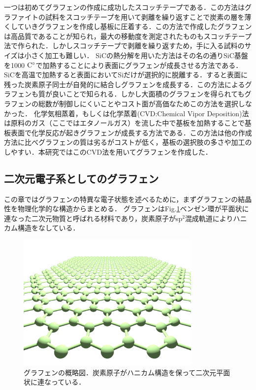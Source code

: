 一つは初めてグラフェンの作成に成功したスコッチテープである．この方法はグラファイトの試料をスコッチテープを用いて剥離を繰り返すことで炭素の層を薄くしていきグラフェンを作成し基板に圧着する．この方法で作成したグラフェンは高品質であることが知られ，最大の移動度を測定されたものもスコッチテープ法で作られた．しかしスコッチテープで剥離を繰り返すため，手に入る試料のサイズは小さく加工も難しい．
SiCの熱分解を用いた方法はその名の通りSiC基盤を1000$\rm\ C^{\circ}$で加熱することにより表面にグラフェンが成長させる方法である．SiCを高温で加熱すると表面においてSiだけが選択的に脱離する．すると表面に残った炭素原子同士が自発的に結合しグラフェンを成長する．この方法によるグラフェンも質が良いことで知られる．しかし大面積のグラフェンを得られてもグラフェンの総数が制御しにくいことやコスト面が高価なためこの方法を選択しなかった．
化学気相蒸着，もしくは化学蒸着(CVD:Chemical Vipor Deposition)法は原料のガス（ここではエタノールガス）を流した中で基板を加熱することで基板表面で化学反応が起きグラフェンが成長する方法である．この方法は他の作成方法に比べグラフェンの質は劣るがコストが低く，基板の選択肢の多さや加工のしやすい．本研究ではこのCVD法を用いてグラフェンを作成した．

\subsection{二次元電子系としてのグラフェン}
この章ではグラフェンの特異な電子状態を述べるために，まずグラフェンの結晶性を物理化学的な構造からまとめる．
グラフェンはFig.\ref{fig:graphene}ベンゼン環が平面状に連なった二次元物質と呼ばれる材料であり，炭素原子がsp$^{2}$混成軌道によりハニカム構造をなしている．
\begin{figure}[t]
 \begin{center}
  \includegraphics[width=90mm]{images/graphene.png}
  \end{center}
   \caption{グラフェンの概略図．炭素原子がハニカム構造を保って二次元平面状に連なっている．}
 \label{fig:graphene}
\end{figure}

